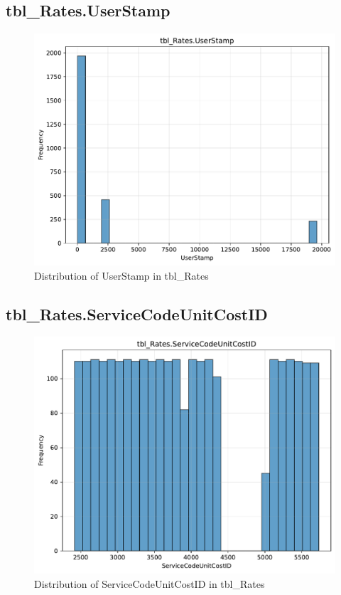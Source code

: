 \subsection{tbl\_Rates.UserStamp}

\begin{figure}[htbp]
\centering
\includegraphics[width=\textwidth]{figures/dbo_tbl_Rates_UserStamp.pdf}
\caption{Distribution of UserStamp in tbl\_Rates}
\end{figure}\newpage

\subsection{tbl\_Rates.ServiceCodeUnitCostID}

\begin{figure}[htbp]
\centering
\includegraphics[width=\textwidth]{figures/dbo_tbl_Rates_ServiceCodeUnitCostID.pdf}
\caption{Distribution of ServiceCodeUnitCostID in tbl\_Rates}
\end{figure}\newpage

